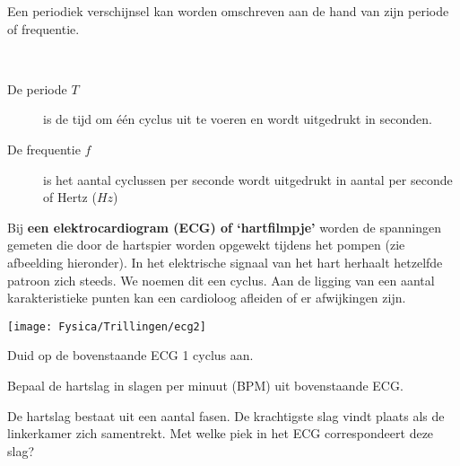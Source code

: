 \documentclass{ximera}
\begin{document}
Een periodiek verschijnsel kan worden omschreven aan de hand van zijn periode of frequentie. 
\begin{definition} \
\begin{description}
    \item[De periode $T$] is de tijd om één cyclus uit te voeren en wordt uitgedrukt in seconden.
    \item[De frequentie $f$] is het aantal cyclussen per seconde wordt uitgedrukt in aantal per seconde of Hertz ($Hz$)
    \begin{center}
    \end{center}
\end{description}
\end{definition}
\begin{example} 
Bij \textbf{een elektrocardiogram (ECG) of ‘hartfilmpje’} worden de spanningen gemeten die door de
hartspier worden opgewekt tijdens het pompen (zie afbeelding hieronder). 
In het elektrische signaal van het hart herhaalt hetzelfde patroon zich steeds. We noemen dit een cyclus.
Aan de ligging van een aantal karakteristieke punten kan een cardioloog afleiden of er afwijkingen zijn.
    \begin{center}
        \texttt{[image: Fysica/Trillingen/ecg2]}
    \end{center}
    \begin{question}
        Duid op de bovenstaande ECG 1 cyclus aan.
    \end{question}

    \begin{question}
       Bepaal de hartslag in slagen per minuut (BPM) uit bovenstaande ECG. 
    \end{question}

    \begin{question}
        De hartslag bestaat uit een aantal fasen. De krachtigste slag vindt plaats als de
linkerkamer zich samentrekt. Met welke piek in het ECG correspondeert deze slag?
    \end{question}
    

\end{example}
\end{document}

